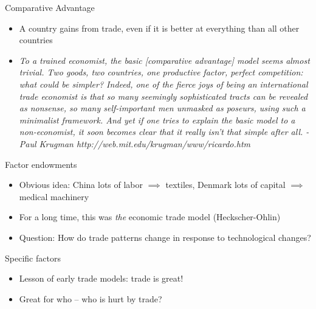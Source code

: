 \documentclass[ignorenonframetext,]{beamer}
\begin{document}
\begin{frame}{Comparative Advantage}

    \begin{itemize}
        \item A country gains from trade, even if it is better at everything than all other countries
        \item {\footnotesize\emph{To a trained economist, the basic [comparative advantage] model seems almost trivial. Two goods, two countries, one productive factor, perfect competition: what could be simpler? Indeed, one of the fierce joys of being an international trade economist is that so many seemingly sophisticated tracts can be revealed as nonsense, so many self-important men unmasked as poseurs, using such a minimalist framework. And yet if one tries to explain the basic model to a non-economist, it soon becomes clear that it really isn't that simple after all. -Paul Krugman http://web.mit.edu/krugman/www/ricardo.htm}}
    \end{itemize}

\end{frame}

\begin{frame}{Factor endowments}

    \begin{itemize}
        \item Obvious idea: China lots of labor $\implies$ textiles, Denmark lots of capital $\implies$ medical machinery
        \item For a long time, this was \emph{the} economic trade model (Heckscher-Ohlin)
        \item Question: How do trade patterns  change in response to technological changes?
    \end{itemize}

\end{frame}

\begin{frame}{Specific factors}

    \begin{itemize}
        \item Lesson of early trade models: trade is great! 
        \item Great for who -- who is hurt by trade?
    \end{itemize}

\end{frame}
\end{document}
